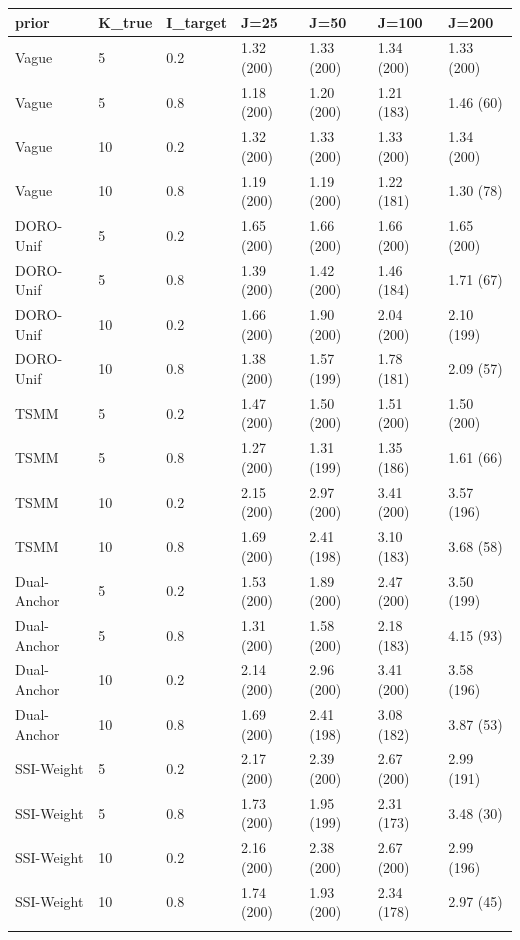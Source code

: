 \begin{longtable}{lllllll}
\toprule
prior & K\_true & I\_target & J=25 & J=50 & J=100 & J=200 \\
\midrule\endhead
Vague & 5 & 0.2 & 1.32 (200) & 1.33 (200) & 1.34 (200) & 1.33 (200) \\ \addlinespace[3pt]
Vague & 5 & 0.8 & 1.18 (200) & 1.20 (200) & 1.21 (183) & 1.46 (60) \\ \addlinespace[3pt]
Vague & 10 & 0.2 & 1.32 (200) & 1.33 (200) & 1.33 (200) & 1.34 (200) \\ \addlinespace[3pt]
Vague & 10 & 0.8 & 1.19 (200) & 1.19 (200) & 1.22 (181) & 1.30 (78) \\ \addlinespace[3pt]
DORO-Unif & 5 & 0.2 & 1.65 (200) & 1.66 (200) & 1.66 (200) & 1.65 (200) \\ \addlinespace[3pt]
DORO-Unif & 5 & 0.8 & 1.39 (200) & 1.42 (200) & 1.46 (184) & 1.71 (67) \\ \addlinespace[3pt]
DORO-Unif & 10 & 0.2 & 1.66 (200) & 1.90 (200) & 2.04 (200) & 2.10 (199) \\ \addlinespace[3pt]
DORO-Unif & 10 & 0.8 & 1.38 (200) & 1.57 (199) & 1.78 (181) & 2.09 (57) \\ \addlinespace[3pt]
TSMM & 5 & 0.2 & 1.47 (200) & 1.50 (200) & 1.51 (200) & 1.50 (200) \\ \addlinespace[3pt]
TSMM & 5 & 0.8 & 1.27 (200) & 1.31 (199) & 1.35 (186) & 1.61 (66) \\ \addlinespace[3pt]
TSMM & 10 & 0.2 & 2.15 (200) & 2.97 (200) & 3.41 (200) & 3.57 (196) \\ \addlinespace[3pt]
TSMM & 10 & 0.8 & 1.69 (200) & 2.41 (198) & 3.10 (183) & 3.68 (58) \\ \addlinespace[3pt]
Dual-Anchor & 5 & 0.2 & 1.53 (200) & 1.89 (200) & 2.47 (200) & 3.50 (199) \\ \addlinespace[3pt]
Dual-Anchor & 5 & 0.8 & 1.31 (200) & 1.58 (200) & 2.18 (183) & 4.15 (93) \\ \addlinespace[3pt]
Dual-Anchor & 10 & 0.2 & 2.14 (200) & 2.96 (200) & 3.41 (200) & 3.58 (196) \\ \addlinespace[3pt]
Dual-Anchor & 10 & 0.8 & 1.69 (200) & 2.41 (198) & 3.08 (182) & 3.87 (53) \\ \addlinespace[3pt]
SSI-Weight & 5 & 0.2 & 2.17 (200) & 2.39 (200) & 2.67 (200) & 2.99 (191) \\ \addlinespace[3pt]
SSI-Weight & 5 & 0.8 & 1.73 (200) & 1.95 (199) & 2.31 (173) & 3.48 (30) \\ \addlinespace[3pt]
SSI-Weight & 10 & 0.2 & 2.16 (200) & 2.38 (200) & 2.67 (200) & 2.99 (196) \\ \addlinespace[3pt]
SSI-Weight & 10 & 0.8 & 1.74 (200) & 1.93 (200) & 2.34 (178) & 2.97 (45) \\ \addlinespace[3pt]
\bottomrule\end{longtable}
